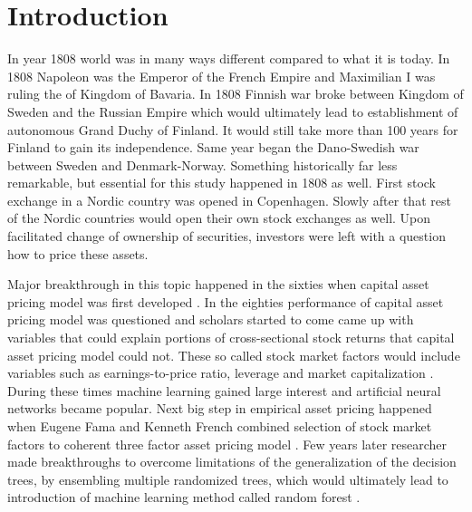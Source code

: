 \documentclass[12pt]{article}
\begin{document}
\section{Introduction} \label{Introduction}
In year 1808 world was in many ways different compared to what it is today. In 1808 Napoleon was the Emperor of the French Empire and Maximilian I was ruling the of Kingdom of Bavaria. In 1808 Finnish war broke between Kingdom of Sweden and the Russian Empire which would ultimately lead to establishment of autonomous Grand Duchy of Finland. It would still take more than 100 years for Finland to gain its independence. Same year began the Dano-Swedish war between Sweden and Denmark-Norway. Something historically far less remarkable, but essential for this study happened in 1808 as well. First stock exchange in a Nordic country was opened in Copenhagen\footnotemark. Slowly after that rest of the Nordic countries would open their own stock exchanges as well. Upon facilitated change of ownership of securities, investors were left with a question how to price these assets. \par


Major breakthrough in this topic happened in the sixties when capital asset pricing model was first developed \citep{Sharpe1964, Lintner1965}. In the eighties performance of capital asset pricing model was questioned and scholars started to come came up with variables that could explain portions of cross-sectional stock returns that capital asset pricing model could not. These so called stock market factors would include variables such as earnings-to-price ratio, leverage and market capitalization \citep{Basu1977, Bhandari1988, BANZ1981}. During these times machine learning gained large interest and artificial neural networks became popular. Next big step in empirical asset pricing happened when Eugene Fama and Kenneth French combined selection of stock market factors to coherent three factor asset pricing model \citep{FAMA19933}. Few years later researcher made breakthroughs to overcome limitations of the generalization of the decision trees, by ensembling multiple randomized trees, which would ultimately lead to introduction of machine learning method called random forest \citep{Ho1995, Breiman20015}. \par
\end{document}
